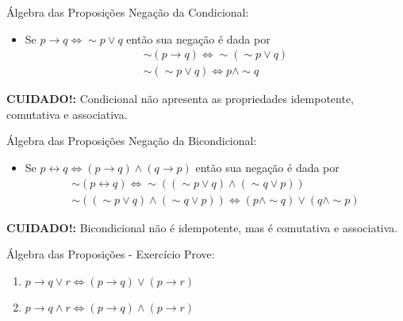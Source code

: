 \begin{frame}[t]{Álgebra das Proposições}
	Negação da Condicional:

	\begin{itemize}
	\item Se $p \rightarrow q \Leftrightarrow \sim p \vee q$ então sua negação é dada por $$\begin{array}{c}\sim(p \rightarrow q) \Leftrightarrow \sim(\sim p \vee q)\\ \sim(\sim p \vee q) \Leftrightarrow p \wedge \sim q \end{array}$$
	\end{itemize}

	\vskip 2cm

	{\bf CUIDADO!:} Condicional não apresenta as propriedades idempotente, comutativa e associativa.
\end{frame}

\begin{frame}[t]{Álgebra das Proposições}
	Negação da Bicondicional:

	\begin{itemize}
	\item Se $p \leftrightarrow q \Leftrightarrow (p \rightarrow q)\wedge (q \rightarrow p)$ então sua negação é dada por $$\begin{array}{c}\sim(p \leftrightarrow q) \Leftrightarrow \sim((\sim p \vee q)\wedge(\sim q \vee p))\\  \sim((\sim p \vee q)\wedge(\sim q \vee p)) \Leftrightarrow (p \wedge \sim q) \vee (q \wedge\sim p) \end{array}$$
	\end{itemize}

	\vskip 2cm

	{\bf CUIDADO!:} Bicondicional não é idempotente, mas é comutativa e associativa.
\end{frame}

\begin{frame}[t]{Álgebra das Proposições - Exercício}
	Prove:

	\begin{enumerate}
	\item $p \rightarrow q \vee r \Leftrightarrow (p \rightarrow q) \vee (p \rightarrow r)$
	\item $p \rightarrow q \wedge r \Leftrightarrow (p \rightarrow q) \wedge (p \rightarrow r)$
	\end{enumerate}
\end{frame}


